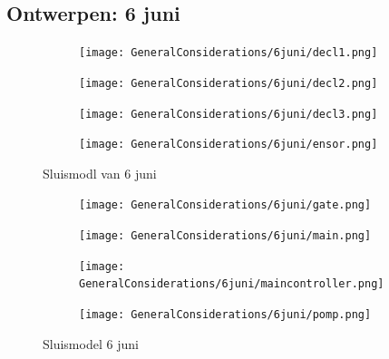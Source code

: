 \documentclass{article}
\begin{document}
	\newpage
	\subsection{Ontwerpen: 6 juni}
	
	
	\begin{figure}
		\centering
		\begin{subfigure}{0.45\linewidth}
			\texttt{[image: GeneralConsiderations/6juni/decl1.png]}
			\caption{}
			\label{fig:1a}
		\end{subfigure}\hfill
		\begin{subfigure}{0.45\linewidth}
			\texttt{[image: GeneralConsiderations/6juni/decl2.png]}
			\caption{}
			\label{fig:1a}
		\end{subfigure}
		
		\begin{subfigure}{0.45\linewidth}
			\texttt{[image: GeneralConsiderations/6juni/decl3.png]}
			\caption{}
			\label{fig:1a}
		\end{subfigure}\hfill
		\begin{subfigure}{0.45\linewidth}
			\texttt{[image: GeneralConsiderations/6juni/ensor.png]}
			\caption{}
			\label{fig:1a}
		\end{subfigure}
		\caption{Sluismodl van 6 juni}
		\label{fig:1}
	\end{figure}
	
	
	
	
	\begin{figure}
		\centering
		\begin{subfigure}{0.45\linewidth}
			\texttt{[image: GeneralConsiderations/6juni/gate.png]}
			\caption{}
			\label{fig:1a}
		\end{subfigure}\hfill
		\begin{subfigure}{0.45\linewidth}
			\texttt{[image: GeneralConsiderations/6juni/main.png]}
			\caption{}
			\label{fig:1a}
		\end{subfigure}
		
		\begin{subfigure}{0.45\linewidth}
			\texttt{[image: GeneralConsiderations/6juni/maincontroller.png]}
			\caption{}
			\label{fig:1a}
		\end{subfigure}\hfill
		\begin{subfigure}{0.45\linewidth}
			\texttt{[image: GeneralConsiderations/6juni/pomp.png]}
			\caption{}
			\label{fig:1a}
		\end{subfigure}
		\caption{Sluismodel 6 juni}
		\label{fig:1}
	\end{figure}
	
\end{document}

